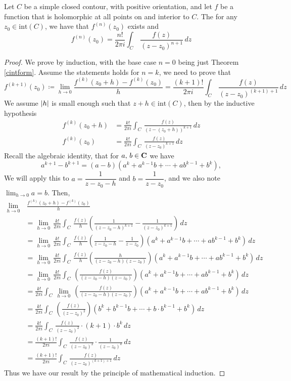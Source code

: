 \medskip

\begin{theorem}\label{gencintform}
Let $C$ be a simple closed contour, with positive orientation, and let $f$ be a function that is holomorphic at all points on and interior to $C$. The for any $z_0 \in \mathrm{int}(C)$, we have that $f^{(n)}(z_0)$ exists and
\[f^{(n)}(z_0) = \frac{n!}{2\pi i}\int_C\,\frac{f(z)}{(z - z_0)^{n+1}}\,dz\]
\end{theorem}
\begin{proof}
We prove by induction, with the base case $n = 0$ being just Theorem \ref{cintform}. Assume the statements holds for $n = k$, we need to prove  that
\[f^{(k+1)}(z_0) \coloneqq \lim_{h \to 0}\frac{f^{(k)}(z_0 + h) - f^{(k)}(z_0)}{h} = \frac{(k+1)!}{2\pi i}\int_C\,\frac{f(z)}{(z - z_0)^{(k+1)+1}}\,dz\]
We assume $\left\lvert h\right\rvert$ is small enough such that $z + h \in \mathrm{int}(C)$, then by the inductive hypothesis
\begin{align*}
f^{(k)}(z_0 + h) &= \frac{k!}{2\pi i}\int_C\,\frac{f(z)}{(z - (z_0 + h))^{k+1}}\,dz\\[1em]
f^{(k)}(z_0) &= \frac{k!}{2\pi i}\int_C\,\frac{f(z)}{(z - z_0)^{k+1}}\,dz
\end{align*}
Recall the algebraic identity, that for $a,\,b \in \mathbf C$ we have
\[a^{k+1} - b^{k+1} = (a - b)(a^k + a^{k-1}b + \cdots + ab^{k-1} + b^k),\]
We will apply this to $a = \dfrac{1}{z - z_0 - h}$ and $b = \dfrac{1}{z - z_0}$, and we also note $\lim_{h \to 0}a = b$. Then,
\begin{align*}
\lim_{h \to 0}&\,\frac{f^{(k)}(z_0 + h) - f^{(k)}(z_0)}{h}\\[1em]
&= \lim_{h \to 0}\,\frac{k!}{2\pi i}\int_C\,\frac{f(z)}{h}\left(\frac{1}{(z - z_0 - h)^{k+1}} - \frac{1}{(z - z_0)^{k+1}}\right)\,dz\\[1em]
 &= \lim_{h \to 0}\,\frac{k!}{2\pi i}\int_C\,\frac{f(z)}{h}\left(\frac{1}{z - z_0 - h} - \frac{1}{z - z_0}\right)(a^k + a^{k-1}b + \cdots + ab^{k-1} + b^k)\,dz \\[1em]
 &= \lim_{h \to 0}\,\frac{k!}{2\pi i}\int_C\,\frac{f(z)}{h}\left(\frac{h}{(z - z_0 - h)(z - z_0)}\right)(a^k + a^{k-1}b + \cdots + ab^{k-1} + b^k)\,dz \\[1em]
 &= \lim_{h \to 0}\,\frac{k!}{2\pi i}\int_C\,\left(\frac{f(z)}{(z - z_0 - h)(z - z_0)}\right)(a^k + a^{k-1}b + \cdots + ab^{k-1} + b^k)\,dz \\[1em]
 &= \frac{k!}{2\pi i}\int_C\,\lim_{h \to 0}\,\left(\frac{f(z)}{(z - z_0 - h)(z - z_0)}\right)(a^k + a^{k-1}b + \cdots + ab^{k-1} + b^k)\,dz \\[1em]
 &= \frac{k!}{2\pi i}\int_C\,\left(\frac{f(z)}{(z - z_0)^2}\right)(b^k + b^{k-1}b + \cdots + b\cdot b^{k-1} + b^k)\,dz\\[1em]
 &= \frac{k!}{2\pi i}\int_C\,\frac{f(z)}{(z - z_0)^2}\cdot(k+1)\cdot b^k\,dz \\[1em]
 &= \frac{(k+1)!}{2\pi i}\int_C\,\frac{f(z)}{(z - z_0)^2}\cdot\frac{1}{(z - z_0)^k}\,dz \\[1em]
 &= \frac{(k+1)!}{2\pi i}\int_C\,\frac{f(z)}{(z - z_0)^{(k+1)+1}}\,dz 
\end{align*}
Thus we have our result by the principle of mathematical induction. 
\end{proof}

